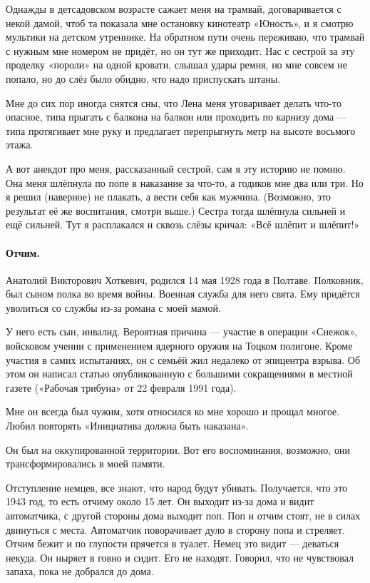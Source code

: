 \documentclass{book}
\begin{document}
Однажды в детсадовском возрасте сажает меня на трамвай,
договаривается с некой дамой, чтоб та показала мне остановку кинотеатр «Юность», 
и я смотрю мультики на детском утреннике.
На обратном пути очень переживаю, что трамвай с нужным мне номером не придёт, но он тут же приходит.
Нас с сестрой за эту проделку «пороли» на одной кровати, слышал удары ремня, но мне совсем не попало, но до слёз было обидно, что надо приспускать штаны.

Мне до сих пор иногда снятся сны, что Лена меня уговаривает делать что-то опасное, типа прыгать с балкона на балкон или проходить по карнизу дома --- типа протягивает мне руку и предлагает перепрыгнуть метр на высоте восьмого этажа.

А вот анекдот про меня, рассказанный сестрой, сам я эту историю не помню.
Она меня шлёпнула по попе в наказание за что-то, а годиков мне два или три.
Но я решил (наверное) не плакать, а вести себя как мужчина.
(Возможно, это результат её же воспитания, смотри выше.)
Сестра тогда шлёпнула сильней и ещё сильней.
Тут я расплакался и сквозь слёзы кричал: «Всё шлёпит и шлёпит!»

\paragraph{Отчим.}
Анатолий Викторович Хоткевич, родился 14 мая 1928 года в Полтаве.
Полковник, был сыном полка во время войны.
Военная служба для него свята.
Ему придётся уволиться со службы из-за романа с моей мамой.

У него есть сын, инвалид.
Вероятная причина --- участие в операции «Снежок», войсковом учении с применением ядерного оружия на Тоцком полигоне.
Кроме участия в самих испытаниях, он с семьёй жил недалеко от эпицентра взрыва.
Об этом он написал статью опубликованную с большими сокращениями в местной газете («Рабочая трибуна» от 22 февраля 1991 года).

Мне он всегда был чужим, хотя относился ко мне хорошо и прощал многое.
Любил повторять «Инициатива должна быть наказана».

Он был на оккупированной территории.
Вот его воспоминания, возможно, они трансформировались в моей памяти.

Отступление немцев, все знают, что народ будут убивать.
Получается, что это 1943 год, то есть отчиму около 15 лет.
Он выходит из-за дома и видит автоматчика, с другой стороны дома выходит поп.
Поп и отчим стоят, не в силах двинуться с места.
Автоматчик поворачивает дуло в сторону попа и стреляет.
Отчим бежит и по глупости прячется в туалет.
Немец это видит --- деваться некуда.
Он ныряет в говно и сидит. 
Его не находят.
Говорил, что не чувствовал запаха, пока не добрался до дома.
\end{document}
